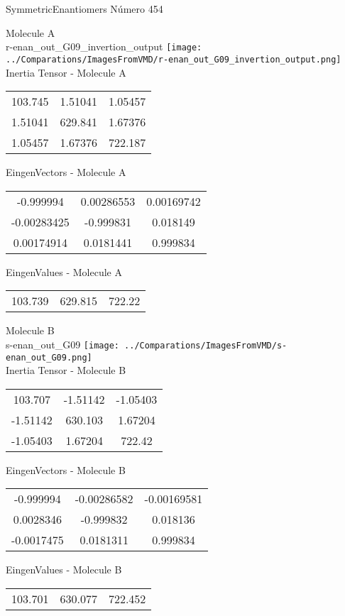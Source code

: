 \vtab[-2cm]
\begin{center}
{\large SymmetricEnantiomers \tab Número 454}
\end{center}
\begin{multicols}{2}
\begin{center}

Molecule A \\ 
r-enan\_out\_G09\_invertion\_output
\texttt{[image: ../Comparations/ImagesFromVMD/r-enan\_out\_G09\_invertion\_output.png]}
\\
Inertia Tensor - Molecule A \\
\vtab

\begin{tabular}{|c c c|}
103.745	 & 	1.51041	 & 	1.05457	 \\
1.51041	 & 	629.841	 & 	1.67376	 \\
1.05457	 & 	1.67376	 & 	722.187
\end{tabular}

\vtab
 EingenVectors - Molecule A     \\
\vtab
\begin{tabular}{|c c c|}
-0.999994	 & 	0.00286553	 & 	0.00169742	 \\
-0.00283425	 & 	-0.999831	 & 	0.018149	 \\
0.00174914	 & 	0.0181441	 & 	0.999834
\end{tabular}

\vtab
 EingenValues - Molecule A     \\
\vtab
\begin{tabular}{|c c c|}
103.739	 & 	629.815	 & 	722.22	 \\
\end{tabular}
\columnbreak

Molecule B \\ 
s-enan\_out\_G09
\texttt{[image: ../Comparations/ImagesFromVMD/s-enan\_out\_G09.png]}
\\
Inertia Tensor - Molecule B \\
\vtab

\begin{tabular}{|c c c|}
103.707	 & 	-1.51142	 & 	-1.05403	 \\
-1.51142	 & 	630.103	 & 	1.67204	 \\
-1.05403	 & 	1.67204	 & 	722.42
\end{tabular}

\vtab
 EingenVectors - Molecule B     \\
\vtab
\begin{tabular}{|c c c|}
-0.999994	 & 	-0.00286582	 & 	-0.00169581	 \\
0.0028346	 & 	-0.999832	 & 	0.018136	 \\
-0.0017475	 & 	0.0181311	 & 	0.999834
\end{tabular}

\vtab
 EingenValues - Molecule B     \\
\vtab
\begin{tabular}{|c c c|}
103.701	 & 	630.077	 & 	722.452	 \\
\end{tabular}

\end{center}
\end{multicols}
